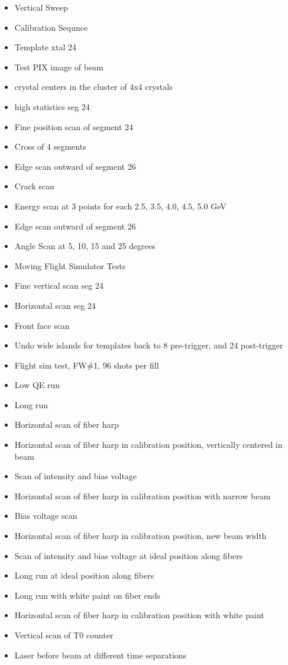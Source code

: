 \begin{itemize}
\item Vertical Sweep 
\item Calibration Sequnce
\item Template xtal 24 
\item Test PIX image of beam 
\item crystal centers in the cluster of 4x4 crystals
\item high statistics seg 24 
\item Fine position scan of segment 24 
\item Cross of 4 segments 
\item Edge scan outward of segment 26 
\item Crack scan 
\item Energy scan at 3 points for each 2.5, 3.5, 4.0, 4.5, 5.0 GeV 
\item Edge scan outward of segment 26 
\item Angle Scan at 5, 10, 15 and 25 degrees 
\item Moving Flight Simulator Tests
\item Fine vertical scan seg 24 
\item Horizontal scan seg 24 
\item Front face scan 
\item Undo wide islands for templates back to 8 pre-trigger, and 24 post-trigger 
\item Flight sim test, FW\#1, 96 shots per fill 
\item Low QE run 
\item Long run 
\item Horizontal scan of fiber harp 
\item Horizontal scan of fiber harp in calibration position, vertically centered in beam 
\item Scan of intensity and bias voltage 
\item Horizontal scan of fiber harp in calibration position with narrow beam 
\item Bias voltage scan 
\item Horizontal scan of fiber harp in calibration position, new beam width 
\item Scan of intensity and bias voltage at ideal position along fibers 
\item Long run at ideal position along fibers 
\item Long run with white paint on fiber ends 
\item Horizontal scan of fiber harp in calibration position with white paint 
\item Vertical scan of T0 counter 
\item Laser before beam at different time separations 
\end{itemize}
